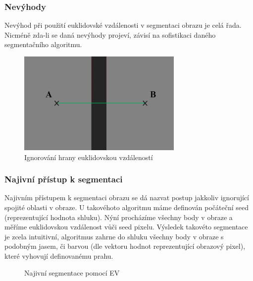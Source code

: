 \documentclass[czech, master, public, dept460, male, cpdeclaration, oneside]{diploma}
\begin{document}
\subsubsection{Nevýhody}
Nevýhod při použití euklidovské vzdálenosti v segmentaci obrazu je celá řada. Nicméně zda-li se daná nevýhody projeví, závisí na sofistikaci daného segmentačního algoritmu.
\begin{figure}[H]
	\vspace*{+3.0mm}
	\centering
	\includegraphics[height=5cm]{Figures/explanatory/euclideanMetric.png}
	\caption{Ignorování hrany euklidovskou vzdáleností}
\end{figure}
\subsubsection{Najivní přístup k segmentaci}
Najivním přístupem k segmentaci obrazu se dá nazvat postup jakkoliv ignorující spojité oblasti v obraze. U takovéhoto algoritmu máme definován počáteční seed (reprezentující hodnota shluku). Nýní procházíme všechny body v obraze a měříme euklidovskou vzdálenost vůči seed pixelu. Výsledek takovéto segmentace je zcela intuitivní, algoritmus zahrne do shluku všechny body v obraze s podobným jasem, či barvou (dle vektoru hodnot reprezentující obrazový pixel), které vyhovují definovanému prahu.

\begin{figure}[H]
	\centering	
	\caption{Najivní segmentace pomocí EV}
\end{figure}
\end{document}

